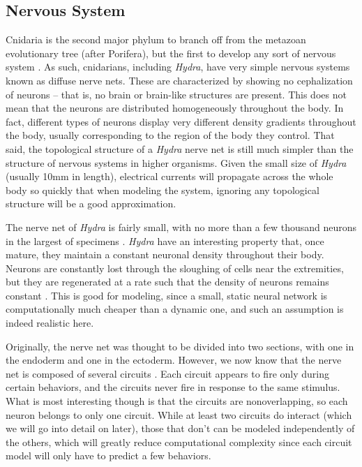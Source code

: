 \documentclass{article}
\begin{document}
\subsection{Nervous System}
Cnidaria is the second major phylum to branch off from the metazoan evolutionary tree (after Porifera), but the first to develop any sort of nervous system \cite{first}. As such, cnidarians, including \textit{Hydra}, have very simple nervous systems known as diffuse nerve nets. These are characterized by showing no cephalization of neurons -- that is, no brain or brain-like structures are present. This does not mean that the neurons are distributed homogeneously throughout the body. In fact, different types of neurons display very different density gradients throughout the body, usually corresponding to the region of the body they control. That said, the topological structure of a \textit{Hydra} nerve net is still much simpler than the structure of nervous systems in higher organisms. Given the small size of \textit{Hydra} (usually 10mm in length), electrical currents will propagate across the whole body so quickly that when modeling the system, ignoring any topological structure will be a good approximation.

The nerve net of \textit{Hydra} is fairly small, with no more than a few thousand neurons in the largest of specimens \cite{neuron_count}. \textit{Hydra} have an interesting property that, once mature, they maintain a constant neuronal density throughout their body. Neurons are constantly lost through the sloughing of cells near the extremities, but they are regenerated at a rate such that the density of neurons remains constant \cite{density}. This is good for modeling, since a small, static neural network is computationally much cheaper than a dynamic one, and such an assumption is indeed realistic here.

Originally, the nerve net was thought to be divided into two sections, with one in the endoderm and one in the ectoderm. However, we now know that the nerve net is composed of several circuits \cite{hydra}. Each circuit appears to fire only during certain behaviors, and the circuits never fire in response to the same stimulus. What is most interesting though is that the circuits are nonoverlapping, so each neuron belongs to only one circuit. While at least two circuits do interact (which we will go into detail on later), those that don't can be modeled independently of the others, which will greatly reduce computational complexity since each circuit model will only have to predict a few behaviors.
\end{document}
